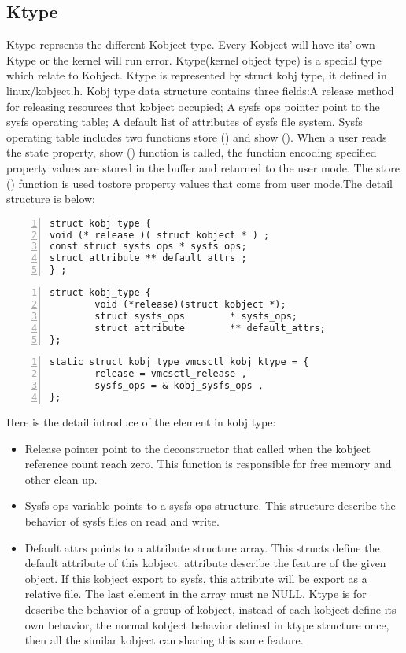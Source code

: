 \documentclass[10pt,draftclsnofoot,journal,compsoc,onecolumn]{IEEEtran}
\begin{document}
\subsection{Ktype}
Ktype reprsents the different Kobject type. Every Kobject will have its' own Ktype or the kernel will run error. Ktype(kernel object type) is a special type which relate to Kobject. Ktype is represented by struct kobj type, it defined in linux/kobject.h. Kobj type data structure contains three fields:A release method for releasing resources that kobject occupied; A sysfs ops pointer point to the sysfs operating table; A default list of attributes of sysfs file system. Sysfs operating table includes two functions store () and show (). When a user reads the state property, show () function is called, the function encoding specified property values are stored in the buffer and returned to the user mode. The store () function is used tostore property values that come from user mode.The detail structure is below:

\begin{lstlisting}[numbers=left]
struct kobj type {
void (* release )( struct kobject * ) ;
const struct sysfs ops * sysfs ops;
struct attribute ** default attrs ;
} ;
\end{lstlisting}

\begin{lstlisting}[numbers=left]
struct kobj_type {
        void (*release)(struct kobject *);
        struct sysfs_ops        * sysfs_ops;
        struct attribute        ** default_attrs;
};
\end{lstlisting}

\begin{lstlisting}[numbers=left]
static struct kobj_type vmcsctl_kobj_ktype = {
		release = vmcsctl_release ,
		sysfs_ops = & kobj_sysfs_ops ,
};
\end{lstlisting}

Here is the detail introduce of the element in kobj type:
\begin{itemize}
\item Release pointer point to the deconstructor that called when the kobject reference count reach zero. This function is responsible for free memory and other clean up.
\item Sysfs ops variable points to a sysfs ops structure. This structure describe the behavior of sysfs files on read and write.
\item Default attrs points to a attribute structure array. This structs define the default attribute of this kobject. attribute describe the feature of the given object. If this kobject export to sysfs, this attribute will be export as a relative file. The last element in the array must ne NULL. Ktype is for describe the behavior of a group of kobject, instead of each kobject define its own behavior, the normal kobject behavior defined in ktype structure once, then all the similar kobject can sharing this same feature.
\end{itemize}
\end{document}
